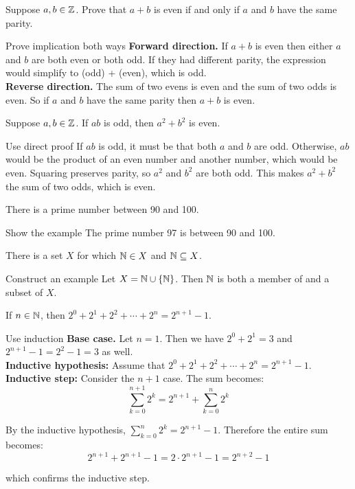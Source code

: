 \documentclass{article}
\begin{document}
\begin{problem}
Suppose $a,b\in\mathbb{Z}$. Prove that $a+b$ is even if and only if $a$ and $b$ have the same parity.
\end{problem}
\begin{solution}{Prove implication both ways}
  \textbf{Forward direction.} If $a + b$ is even then either $a$ and $b$ are both even or both odd. If they had different parity, the expression would simplify to (odd)  + (even), which is odd.
  \\
  \textbf{Reverse direction.} The sum of two evens is even and the sum of two odds is even. So if $a$ and $b$ have the same parity then $a + b$ is even.
\end{solution}

\begin{problem}
Suppose $a,b\in\mathbb{Z}$. If $ab$ is odd, then $a^2 + b^2$ is even.
\end{problem}
\begin{solution}{Use direct proof}
  If $ab$ is odd, it must be that both $a$ and $b$ are odd. Otherwise, $ab$ would be the product of an even number and another number, which would be even. Squaring preserves parity, so $a^2$ and $b^2$ are both odd. This makes $a^2 + b^2$ the sum of two odds, which is even.
\end{solution}

\begin{problem}
There is a prime number between 90 and 100.
\end{problem}
\begin{solution}{Show the example}
  The prime number 97 is between 90 and 100.
\end{solution}

\begin{problem}
There is a set $X$ for which $\mathbb{N} \in X$ and $\mathbb{N} \subseteq X$.
\end{problem}
\begin{solution}{Construct an example}
  Let $X = \mathbb{N} \cup \{\mathbb{N}\}$. Then $\mathbb{N}$ is both a member of and a subset of $X$.
\end{solution}

\begin{problem}
If $n\in\mathbb{N}$, then $2^0 + 2^1 + 2^2 + \cdots + 2^n = 2^{n+1} - 1$.
\end{problem}
\begin{solution}{Use induction}
  \textbf{Base case.} Let $n = 1$. Then we have $2^0 + 2^1 = 3$ and  $2^{n+1} - 1 = 2^2 - 1 = 3$ as well.
  \\

  \textbf{Inductive hypothesis:} Assume that $2^0 + 2^1 + 2^2 + \cdots + 2^n = 2^{n+1} - 1$.
  \\

  \textbf{Inductive step:} Consider the $n+1$ case. The sum becomes:
  $$\sum_{k=0}^{n+1} 2^k = 2^{n+1} + \sum_{k=0}^{n} 2^k$$

  By the inductive hypothesis, $\sum\limits_{k=0}^{n} 2^k = 2^{n+1} - 1$. Therefore the entire sum becomes:
  $$2^{n+1} + 2^{n+1} - 1 = 2\cdot 2^{n+1} - 1 = 2^{n+2} - 1$$

  which confirms the inductive step.

\end{solution}
\end{document}
